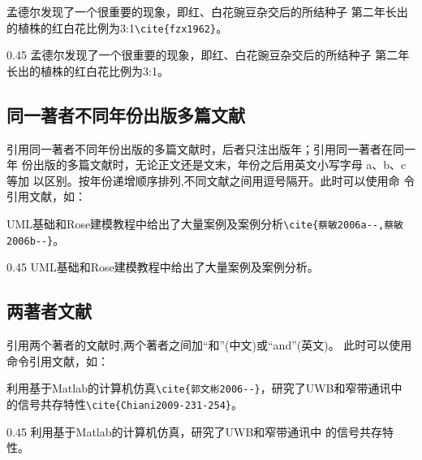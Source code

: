 \begin{center}
  \begin{minipage}{0.45\textwidth}
    \small
    孟德尔发现了一个很重要的现象，即红、白花豌豆杂交后的所结种子
      第二年长出的植株的红白花比例为3:1\verb|\cite{fzx1962}|。%
  \end{minipage}
  \begin{boxedminipage}{0.45\textwidth}
    \small
    孟德尔发现了一个很重要的现象，即红、白花豌豆杂交后的所结种子
      第二年长出的植株的红白花比例为3:1\cite{fzx1962}。%
  \end{boxedminipage}
\end{center}

\subsection{同一著者不同年份出版多篇文献}
引用同一著者不同年份出版的多篇文献时，后者只注出版年；引用同一著者在同一年
份出版的多篇文献时，无论正文还是文末，年份之后用英文小写字母 a、b、c 等加
以区别。按年份递增顺序排列,不同文献之间用逗号隔开。此时可以使用命
令引用文献，如：

\begin{center}
  \begin{minipage}{0.45\textwidth}
    \small
    UML基础和Rose建模教程中给出了大量案例及案例分析\verb|\cite{蔡敏2006a--,蔡敏2006b--}|。%
  \end{minipage}
  \begin{boxedminipage}{0.45\textwidth}
    \small
    UML基础和Rose建模教程中给出了大量案例及案例分析\cite{蔡敏2006a--,蔡敏2006b--}。%
  \end{boxedminipage}
\end{center}

\subsection{两著者文献}

引用两个著者的文献时,两个著者之间加\enquote{和}(中文)或\enquote{and}(英文)。
此时可以使用命令引用文献，如：

\begin{center}
  \begin{minipage}{0.45\textwidth}
    \small
    利用基于Matlab的计算机仿真\verb|\cite{郭文彬2006--}|，研究了UWB和窄带通讯中
      的信号共存特性\verb|\cite{Chiani2009-231-254}|。%
  \end{minipage}
  \begin{boxedminipage}{0.45\textwidth}
    \small
    利用基于Matlab的计算机仿真\cite{郭文彬2006--}，研究了UWB和窄带通讯中
      的信号共存特性\cite{Chiani2009-231-254}。%
  \end{boxedminipage}
\end{center}

